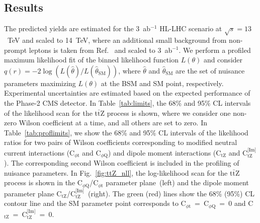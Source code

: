 \documentclass[letterpaper,11pt]{article}
\def\ttZ{t$\bar{\text{t}}$Z\xspace}
\def\ctZ{C$_\text{tZ}$\xspace}
\def\ctZI{C$_\text{tZ}^\text{[Im]}$\xspace}
\def\cpt{C$_{\phi \text{t}}$\xspace}
\def\cpQM{C$_{\phi \text{Q}}$\xspace}
\def\TeV{TeV\xspace}
\begin{document}
\subsection{Results}
\label{sec:results}

The predicted yields are estimated for the 3~ab${}^{-1}$ HL-LHC scenario at $\sqrt{s}=13$~\TeV and scaled to 14~\TeV, where an additional small background from non-prompt leptons is taken from Ref.~\cite{Sirunyan:2017uzs} and scaled to 3~ab${}^{-1}$.
We perform a profiled maximum likelihood fit of the binned likelihood function $L(\theta)$ and consider $q(r)=-2\log(L(\hat{\theta})/L(\hat{\theta}_{\textrm{SM}}))$, where $\hat{\theta}$ and
$\hat{\theta}_\textrm{SM}$ are the set of nuisance parameters maximizing $L(\theta)$ at the BSM and SM point, respectively.
Experimental uncertainties are estimated based on the expected performance of the Phase-2 CMS detector.
In Table~\ref{tab:limits}, the 68\% and 95\% CL intervals of the likelihood scan for the \ttZ process is shown, where we consider one non-zero Wilson coefficient at a time, and all others are set to zero.
In Table~\ref{tab:proflimits}, we show the 68\% and 95\% CL intervals of the likelihood ratios for two pairs of Wilson coefficients corresponding to modified neutral current interactions (\cpt and \cpQM) and dipole moment interactions (\ctZ and \ctZI).
The corresponding second Wilson coefficient is included in the profiling of nuisance parameters.
In Fig.~\ref{fig:ttZ_nll}, the log-likelihood scan for the \ttZ process is shown in the \cpQM/\cpt parameter plane~(left) and the dipole moment parameter plane \ctZ/\ctZI~(right).
The green (red) lines show the 68\% (95\%) CL contour line and the SM parameter point corresponds to \cpt~=~\cpQM~=~0 and \ctZ~=~\ctZI~=~0.
\end{document}

